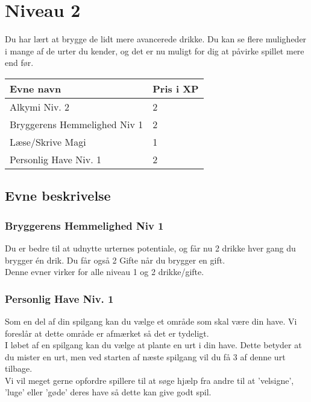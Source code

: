 \chapter{Niveau 2}
Du har lært at brygge de lidt mere avancerede drikke. Du kan se flere muligheder i mange af de urter du kender, og det er nu muligt for dig at påvirke spillet mere end før.\\
\begin{table}[H]
    \centering
    \begin{tabular}{|p{}|p{}|}
    \rowcolor{cerulean!80}\hline
        Evne navn & Pris i XP \\\hline
         Alkymi Niv. 2 & 2 \\\hline
         Bryggerens Hemmelighed Niv 1 & 2 \\\hline
         Læse/Skrive Magi & 1 \\\hline
         Personlig Have Niv. 1 & 2 \\
         \hline
    \end{tabular}
\end{table}
\section{Evne beskrivelse}



\subsection{Bryggerens Hemmelighed Niv 1}
Du er bedre til at udnytte urternes potentiale, og får nu 2 drikke hver gang du brygger én drik. Du får også 2 Gifte når du brygger en gift.\\
Denne evner virker for alle niveau 1 og 2 drikke/gifte.\\



\subsection{Personlig Have Niv. 1}
Som en del af din spilgang kan du vælge et område som skal være din have. Vi foreslår at dette område er afmærket så det er tydeligt.\\
I løbet af en spilgang kan du vælge at plante en urt i din have. Dette betyder at du mister en urt, men ved starten af næste spilgang vil du få 3 af denne urt tilbage.\\
Vi vil meget gerne opfordre spillere til at søge hjælp fra andre til at 'velsigne', 'luge' eller 'gøde' deres have så dette kan give godt spil.\\
\\
